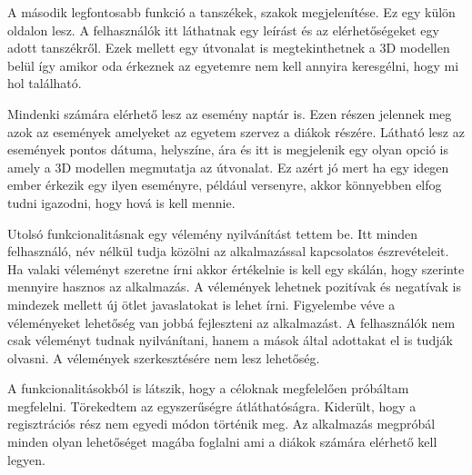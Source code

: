 A második legfontosabb funkció a tanszékek, szakok megjelenítése. Ez egy külön oldalon lesz. A felhasználók itt láthatnak egy leírást és az elérhetőségeket egy adott tanszékről. Ezek mellett egy útvonalat is megtekinthetnek a 3D modellen belül így amikor oda érkeznek az egyetemre nem kell annyira keresgélni, hogy mi hol található. 

Mindenki számára elérhető lesz az esemény naptár is. Ezen részen jelennek meg azok az események amelyeket az egyetem szervez a diákok részére. Látható lesz az események pontos dátuma, helyszíne, ára és itt is megjelenik egy olyan opció is amely a 3D modellen megmutatja az útvonalat. Ez azért jó mert ha egy idegen ember érkezik egy ilyen eseményre, például versenyre, akkor könnyebben elfog tudni igazodni, hogy hová is kell mennie.

Utolsó funkcionalitásnak egy vélemény nyilvánítást tettem be. Itt minden felhasználó, név nélkül tudja közölni az alkalmazással kapcsolatos észrevételeit. Ha valaki véleményt szeretne írni akkor értékelnie is kell egy skálán, hogy szerinte mennyire hasznos az alkalmazás. A vélemények lehetnek pozitívak és negatívak is mindezek mellett új ötlet javaslatokat is lehet írni. Figyelembe véve a véleményeket lehetőség van jobbá fejleszteni az alkalmazást. A felhasználók nem csak véleményt tudnak nyilvánítani, hanem a mások által adottakat el is tudják olvasni. A vélemények szerkesztésére nem lesz lehetőség.

A funkcionalitásokból is látszik, hogy a céloknak megfelelően próbáltam megfelelni. Törekedtem az egyszerűségre átláthatóságra. Kiderült, hogy a regisztrációs rész nem egyedi módon történik meg. Az alkalmazás megpróbál minden olyan lehetőséget magába foglalni ami a diákok számára elérhető kell legyen.